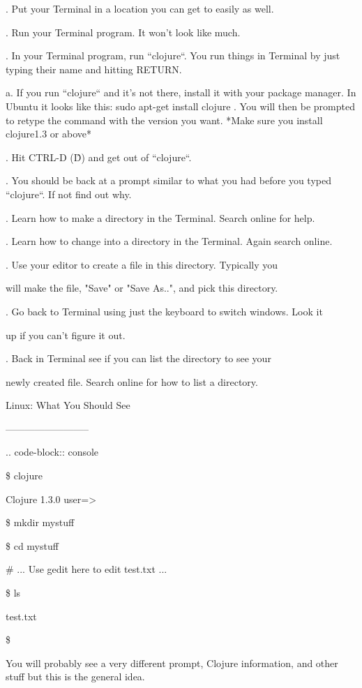. Put your Terminal in a location you can get to easily as well.
	
. Run your Terminal program.  It won't look like much.
	
. In your Terminal program, run ``clojure``.  You run things in Terminal by just typing their name and hitting RETURN.
	
	
   a. If you run ``clojure`` and it's not there, install it with your package manager. In Ubuntu it looks like this: sudo apt-get install clojure . You will then be prompted to retype the command with the version you want.  *Make sure you install clojure1.3 or above*
	
	
. Hit CTRL-D (\^D) and get out of ``clojure``.
	
. You should be back at a prompt similar to what you had before you typed ``clojure``.  If not find out why.
	
. Learn how to make a directory in the Terminal. Search online for help.
	
. Learn how to change into a directory in the Terminal.  Again search online.
	
. Use your editor to create a file in this directory.  Typically you
	
    will make the file, "Save" or "Save As..", and pick this directory.
	
. Go back to Terminal using just the keyboard to switch windows.  Look it
	
    up if you can't figure it out.
	
. Back in Terminal see if you can list the directory to see your 
	
    newly created file.  Search online for how to list a directory.
	
	
	
Linux: What You Should See
	
--------------------------
	
	
	
.. code-block:: console
	
	
    \$ clojure
	
    Clojure 1.3.0
	user=> 
	
    \$ mkdir mystuff
	
    \$ cd mystuff
	
    \# ... Use gedit here to edit test.txt ...
	
    \$ ls
	
    test.txt
	
    \$ 
	
	
You will probably see a very different prompt, Clojure information, and other stuff but this is the general idea.
	

